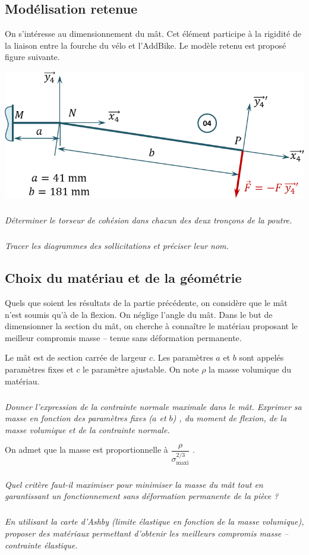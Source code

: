 \documentclass[10pt,fleqn]{article} %
\begin{document}
\begin{multicols}{2}
\subsection*{Modélisation retenue}
On s'intéresse au dimensionnement du mât. Cet élément participe à la rigidité de la liaison entre la fourche du vélo et l'AddBike. Le modèle retenu est proposé figure suivante. 


\begin{center}
\includegraphics[width=\linewidth]{images/fig_03}
\end{center}


\subparagraph{}\textit{Déterminer le torseur de cohésion dans chacun des deux tronçons de la poutre.} 
\subparagraph{}\textit{Tracer les diagrammes des sollicitations et préciser leur nom.}
\subsection*{Choix du matériau et de la géométrie}

Quels que soient les résultats de la partie précédente, on considère que le mât n’est soumis qu’à de la flexion. On néglige l’angle du mât. Dans le but de dimensionner la section du mât, on cherche à connaître le matériau proposant le meilleur compromis masse -- tenue sans déformation permanente. 

Le mât est de section carrée de largeur $c$.
Les paramètres $a$ et $b$  sont appelés paramètres fixes et $c$  le paramètre ajustable. 
On note $\rho$ la masse volumique du matériau. 

\subparagraph{}\textit{Donner l’expression de la contrainte normale maximale dans le mât. 
Exprimer sa masse en fonction des paramètres fixes ($a$  et $b$) , du moment de flexion, de la masse volumique et de la contrainte normale. }
	

On admet que la masse est proportionnelle à $\dfrac{\rho}{\sigma_{\text{maxi}}^{2/3}}$ .

\subparagraph{}\textit{Quel critère faut-il maximiser pour minimiser la masse du mât tout en garantissant un fonctionnement sans déformation permanente de la pièce ?}
\subparagraph{}\textit{En utilisant la carte d’Ashby (limite élastique en fonction de la masse volumique), proposer des matériaux permettant d’obtenir les meilleurs compromis masse – contrainte élastique.}
	


\end{multicols}
\end{document}
